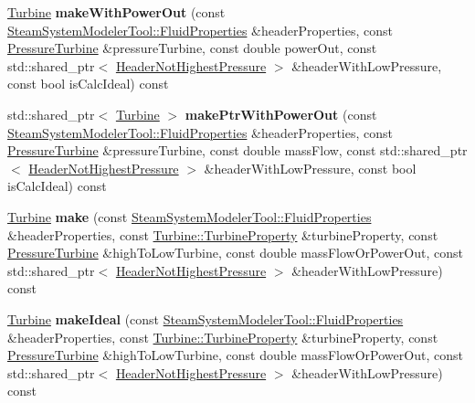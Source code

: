 \begin{DoxyCompactItemize}
\hyperlink{class_turbine}{Turbine} {\bfseries make\+With\+Power\+Out} (const \hyperlink{struct_steam_system_modeler_tool_1_1_fluid_properties}{Steam\+System\+Modeler\+Tool\+::\+Fluid\+Properties} \&header\+Properties, const \hyperlink{class_pressure_turbine}{Pressure\+Turbine} \&pressure\+Turbine, const double power\+Out, const std\+::shared\+\_\+ptr$<$ \hyperlink{class_header_not_highest_pressure}{Header\+Not\+Highest\+Pressure} $>$ \&header\+With\+Low\+Pressure, const bool is\+Calc\+Ideal) const
\item 
\mbox{\label{class_turbine_factory_aaf6c698883d9ecef84d5ea16ba65e589}} 
std\+::shared\+\_\+ptr$<$ \hyperlink{class_turbine}{Turbine} $>$ {\bfseries make\+Ptr\+With\+Power\+Out} (const \hyperlink{struct_steam_system_modeler_tool_1_1_fluid_properties}{Steam\+System\+Modeler\+Tool\+::\+Fluid\+Properties} \&header\+Properties, const \hyperlink{class_pressure_turbine}{Pressure\+Turbine} \&pressure\+Turbine, const double mass\+Flow, const std\+::shared\+\_\+ptr$<$ \hyperlink{class_header_not_highest_pressure}{Header\+Not\+Highest\+Pressure} $>$ \&header\+With\+Low\+Pressure, const bool is\+Calc\+Ideal) const
\item 
\mbox{\label{class_turbine_factory_acf5435509834ef1d0694b1323ad7f8df}} 
\hyperlink{class_turbine}{Turbine} {\bfseries make} (const \hyperlink{struct_steam_system_modeler_tool_1_1_fluid_properties}{Steam\+System\+Modeler\+Tool\+::\+Fluid\+Properties} \&header\+Properties, const \hyperlink{class_turbine_a5db4f65cf2539e3837684d53221ade12}{Turbine\+::\+Turbine\+Property} \&turbine\+Property, const \hyperlink{class_pressure_turbine}{Pressure\+Turbine} \&high\+To\+Low\+Turbine, const double mass\+Flow\+Or\+Power\+Out, const std\+::shared\+\_\+ptr$<$ \hyperlink{class_header_not_highest_pressure}{Header\+Not\+Highest\+Pressure} $>$ \&header\+With\+Low\+Pressure) const
\item 
\mbox{\label{class_turbine_factory_a4b5e84997feaeccd74b4a1a52842a874}} 
\hyperlink{class_turbine}{Turbine} {\bfseries make\+Ideal} (const \hyperlink{struct_steam_system_modeler_tool_1_1_fluid_properties}{Steam\+System\+Modeler\+Tool\+::\+Fluid\+Properties} \&header\+Properties, const \hyperlink{class_turbine_a5db4f65cf2539e3837684d53221ade12}{Turbine\+::\+Turbine\+Property} \&turbine\+Property, const \hyperlink{class_pressure_turbine}{Pressure\+Turbine} \&high\+To\+Low\+Turbine, const double mass\+Flow\+Or\+Power\+Out, const std\+::shared\+\_\+ptr$<$ \hyperlink{class_header_not_highest_pressure}{Header\+Not\+Highest\+Pressure} $>$ \&header\+With\+Low\+Pressure) const

\end{DoxyCompactItemize}
